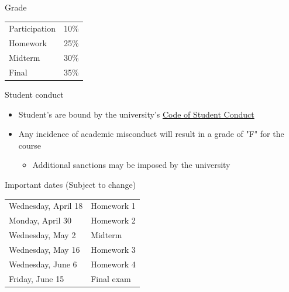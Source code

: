\documentclass[10pt]{beamer}
\begin{document}
\begin{frame}[label={sec:orgc34512c}]{}
\alert{Grade}
\begin{center}
\begin{tabular}{ll}
Participation & 10\%\\
Homework & 25\%\\
Midterm & 30\%\\
Final & 35\%\\
\end{tabular}
\end{center}
\end{frame}

\begin{frame}[label={sec:orgb410fbf}]{}
\alert{Student conduct}
\begin{itemize}
\item Student's are bound by the university's \href{http://studentlife.oregonstate.edu/sites/studentlife.oregonstate.edu/files/code\_of\_student\_conduct.pdf}{Code of Student Conduct}
\item Any incidence of academic misconduct will result in a grade of "F" for the course 
\begin{itemize}
\item Additional sanctions may be imposed by the university
\end{itemize}
\end{itemize}
\end{frame}

\begin{frame}[label={sec:org0d89b84}]{}
\alert{Important dates}
(Subject to change)
\begin{center}
\begin{tabular}{ll}
Wednesday, April 18 & Homework 1\\
Monday, April 30 & Homework 2\\
Wednesday, May 2 & Midterm\\
Wednesday, May 16 & Homework 3\\
Wednesday, June 6 & Homework 4\\
Friday, June 15 & Final exam\\
\end{tabular}
\end{center}
\end{frame}
\end{document}
